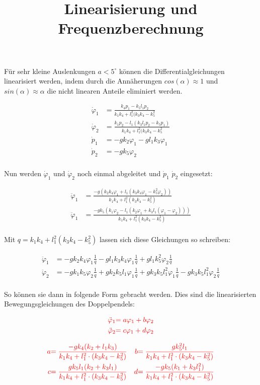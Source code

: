 \documentclass[a3paper, 12pt, landscape]{article}
\title{\vspace{-4cm}\fontsize{96pt}{100pt}\selectfont Linearisierung und Frequenzberechnung}
\author{ }
\date{ }
\newcommand{\mathematik}{\begin{equation*}\begin{aligned}}
\newcommand{\mathematikstop}{\end{aligned}\end{equation*}}
\renewcommand{\phi}{\varphi} %
\newcommand{\phid}{\dot{\phi}}  %
\newcommand{\phidd}{\ddot{\phi}}  %
\newcommand{\qtel}{\frac{1}{q}} %
\begin{document}
\LARGE
\maketitle
\begin{multicols}{2}

Für sehr kleine Auslenkungen $a < 5^\circ$ können die Differentialgleichungen linearisiert werden, indem durch die Annäherungen $cos(\alpha) \approx 1$ und $sin(\alpha) \approx \alpha$ die nicht linearen Anteile eliminiert werden.

\mathematik
\phid_1 &= \frac{k_4 p_1 - k_5 l_1 p_2}{k_1 k_4 + l_1^2 (k_3 k_4 - k_5^2}\\
\phid_2 &= \frac{k_1 p_2 - l_1 (k_3 l_1 p_2 - k_5 p_1)}{k_1 k_4 + l_1^2 (k_3 k_4 - k_5^2}\\
\dot{p}_1 &= -g k_2 \phi_1 - g l_1 k_3 \phi_1 \\
\dot{p}_2 &= -g k_5 \phi_2 \\
\mathematikstop

Nun werden $\phid_1$ und $\phid_2$ noch einmal abgeleitet und $\dot{p}_1$ $\dot{p}_2$ eingesetzt:

\mathematik
\phidd_1 &= \frac{-g (k_2 k_4 \phi_1 + l_1 (k_3 k_4 \phi_1 - k_5^2 \phi_2))}{k_1 k_4 + l_1^2 (k_3 k_4 - k_5^2)} \\
\phidd_1 &= \frac{-g k_5 (k_1 \phi_2 - l_1 (k_2 \phi_1 + k_3 l_1 (\phi_1-\phi_2)))}{k_1 k_4 + l_1^2 (k_3 k_4 - k_5^2)} \\
\mathematikstop

\columnbreak
Mit $q = k_1 k_4 + l_1^2 (k_3 k_4 - k_5^2)$ lassen sich diese Gleichungen so schreiben:

\mathematik
\phidd_1 &= -g k_2 k_4 \phi_1 \qtel - g l_1 k_3 k_4 \phi_1 \qtel + g l_1 k_5^2 \phi_2 \qtel \\
\phidd_2 &= -g k_1 k_5 \phi_2 \qtel + g k_2 k_5 l_1 \phi_1 \qtel + g k_3 k_5 l_1^2 \phi_1 \qtel - g k_3 k_5 l_1^2 \phi_2 \qtel \\
\mathematikstop

So können sie dann in folgende Form gebracht werden. Dies sind die linearisierten Bewegungsgleichungen des Doppelpendels:

\mathematik
\textcolor{red}{\phidd_1} &\textcolor{red}{= a \phi_1 + b \phi_2}\\
\textcolor{red}{\phidd_2} &\textcolor{red}{= c \phi_1 + d \phi_2}\\
\mathematikstop

\mathematik
\textcolor{red}{a}   &\textcolor{red}{= \frac{-g k_4 (k_2 + l_1 k_3)}{k_1 k_4 + l_1^2 \cdot (k_3 k_4 - k_5^2)}}
& \textcolor{red}{b} &\textcolor{red}{= \frac{g k_5^2 l_1}{k_1 k_4 + l_1^2 \cdot (k_3 k_4 - k_5^2)}} \\
\textcolor{red}{c}   &\textcolor{red}{= \frac{g k_5 l_1 (k_2 + k_3 l_1)}{k_1 k_4 + l_1^2 \cdot (k_3 k_4 - k_5^2)}}
& \textcolor{red}{d} &\textcolor{red}{= \frac{-g k_5 (k_1 + k_3 l_1^2)}{k_1 k_4 + l_1^2 \cdot (k_3 k_4 - k_5^2)}} \\
\mathematikstop


\end{multicols}
\end{document}
